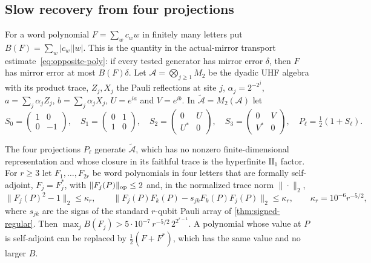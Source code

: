 \subsection{Slow recovery from four projections}\label{app:floor-slow}

For a word polynomial $F=\sum_wc_ww$ in finitely many letters put $B(F)=\sum_w|c_w||w|$. This is the quantity in the actual-mirror
transport estimate~\eqref{eq:opposite-poly}: if every tested generator has mirror error $\delta$, then $F$ has mirror error at most
$B(F)\delta$. Let $\mathcal A=\bigotimes_{j\ge1}M_2$ be the dyadic UHF algebra with its product trace, $Z_j,X_j$ the Pauli reflections at site
$j$, $\alpha_j=2^{-2^j}$, $a=\sum_j\alpha_jZ_j$, $b=\sum_j\alpha_jX_j$, $U=e^{ia}$ and $V=e^{ib}$. In $\widetilde{\mathcal A}=M_2(\mathcal A)$ let
\[
S_0=\begin{pmatrix}1&0\\0&-1\end{pmatrix},\quad S_1=\begin{pmatrix}0&1\\1&0\end{pmatrix},\quad S_2=\begin{pmatrix}0&U\\U^*&0\end{pmatrix},\quad
S_3=\begin{pmatrix}0&V\\V^*&0\end{pmatrix},\quad P_\ell=\tfrac12(1+S_\ell).
\]

\begin{proposition}\label{prop:slow-recovery}
The four projections $P_\ell$ generate $\widetilde{\mathcal A}$, which has no nonzero finite-dimensional representation and whose closure in its
faithful trace is the hyperfinite $\mathrm{II}_1$ factor. For $r\ge3$ let $F_1,\dots,F_{2r}$ be word polynomials in four letters that
are formally self-adjoint, $F_j=F_j^*$, with $\lVert F_j(P)\rVert_{\mathrm{op}}\le2$ and, in the normalized trace norm $\|\cdot\|_2$,
\[
\|F_j(P)^2-1\|_2\le\kappa_r,\qquad\|F_j(P)F_k(P)-s_{jk}F_k(P)F_j(P)\|_2\le\kappa_r,\qquad\kappa_r=10^{-6}r^{-5/2},
\]
where $s_{jk}$ are the signs of the standard $r$-qubit Pauli array of \cref{thm:signed-regular}. Then
$\max_jB(F_j)>5\cdot10^{-7}\,r^{-5/2}\,2^{2^{r-1}}$. A polynomial whose value at $P$ is self-adjoint can be replaced by $\frac12(F+F^*)$,
which has the same value and no larger $B$.
\end{proposition}

